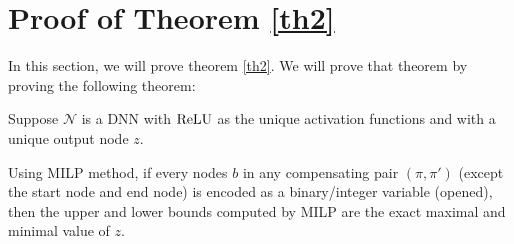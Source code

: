				
				
				\section{Proof of Theorem \ref{th2}}
				
				In this section, we will prove theorem \ref{th2}. We will prove that theorem by proving the following theorem:
				
				\begin{theorem}
				
					
					Suppose $\mathcal{N}$ is a DNN with $\mathrm{ReLU}$ as the unique activation functions and with a unique output node $z$.
					
					Using MILP method, if every nodes $b$ in any compensating pair
					$(\pi,\pi')$ (except the start node and end node) is encoded as a binary/integer variable (opened), then the upper and lower 
					bounds computed by MILP are the exact maximal and minimal value of $z$.
				\end{theorem}
				
